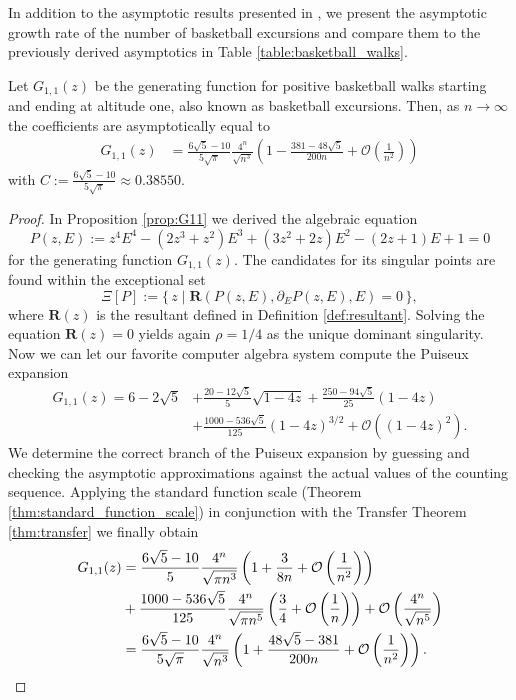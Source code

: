In addition to the asymptotic results presented in \cite{Basketball}, we present the asymptotic growth rate of the number of basketball excursions and compare them to the previously derived asymptotics in Table \ref{table:basketball_walks}.

\begin{theorem}[{Asymptotics of $[z^n]G_{1,1}(z)$}]
  Let $G_{1,1}(z)$ be the generating function for positive basketball walks starting and ending at altitude one, also known as basketball excursions. Then, as $n \to \infty$ the coefficients are asymptotically equal to 
  \begin{align*}
    [z^{n}]G_{1,1}(z) &= \frac{6\sqrt{5} - 10}{5\sqrt{\pi}}\frac{4^n}{\sqrt{n^3}}
    \left(
      1 - \frac{381 - 48\sqrt{5}}{200n} + \mathcal{O}\left(\frac{1}{n^2}\right)
    \right)
  \end{align*}
  with $C := \frac{6\sqrt{5} - 10}{5\sqrt{\pi}} \approx 0.38550$.
\end{theorem}

\begin{proof}
  In Proposition \ref{prop:G11} we derived the algebraic equation
  $$
    P(z,E) := z^{4}E^{4} - (2z^{3}+z^{2})E^{3} + (3z^{2}+2z)E^{2} - (2z+1)E + 1 = 0
  $$
  for the generating function $G_{1,1}(z)$. The candidates for its singular points are found within the exceptional set 
  $$
    \Xi[P] := \{\, z \mid \textbf{R}(P(z,E), \partial_E P(z,E), E) = 0 \,\},
  $$
  where $\textbf{R}(z)$ is the resultant defined in Definition \ref{def:resultant}. Solving the equation $\textbf{R}(z) = 0$ yields again $\rho = 1/4$ as the unique dominant singularity. Now we can let our favorite computer algebra system compute the Puiseux expansion
  \begin{align*}
    G_{1,1}(z) = 6 - 2\sqrt{5} &+ \frac{20 - 12\sqrt{5}}{5}\sqrt{1 - 4z} + \frac{250 - 94\sqrt{5}}{25}(1 - 4z) \\
    &+ \frac{1000 - 536\sqrt{5}}{125}(1 - 4z)^{3/2} + \mathcal{O}\left((1-4z)^2\right).
  \end{align*}
  We determine the correct branch of the Puiseux expansion by guessing and checking the asymptotic approximations against the actual values of the counting sequence.
  Applying the standard function scale (Theorem \ref{thm:standard_function_scale}) in conjunction with the Transfer Theorem \ref{thm:transfer} we finally obtain
  \begin{align*}
    [z^n] G_{1,1}(z) &= \frac{6\sqrt{5} - 10}{5}\frac{4^{n}}{\sqrt{\pi n^{3}}}
    \left(
      1 + \frac{3}{8n} + 
      \mathcal{O}\left(\frac{1}{n^{2}}\right)
    \right) \\
    &+
    \frac{1000 - 536\sqrt{5}}{125}\frac{4^{n}}{\sqrt{\pi n^{5}}}
    \left(
      \frac{3}{4} + \mathcal{O}\left(\frac{1}{n}\right)
    \right) +
    \mathcal{O}\left(\frac{4^{n}}{\sqrt{n^{5}}}\right) \\
    &= \frac{6\sqrt{5} - 10}{5\sqrt{\pi}}\frac{4^n}{\sqrt{n^3}}
    \left(
      1 + \frac{48\sqrt{5}-381}{200n} + \mathcal{O}\left(\frac{1}{n^2}\right)
    \right). \qedhere
  \end{align*}
\end{proof}

